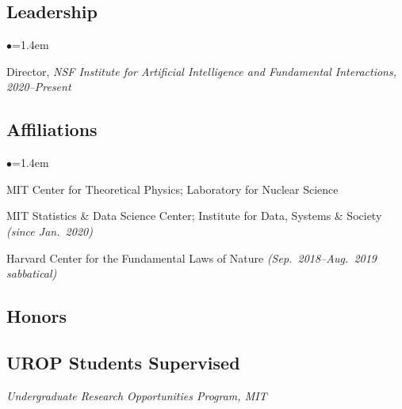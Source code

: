 \documentclass[11pt]{article}
\newcommand{\heading}[1]{\vspace{0in}\subsection*{#1} \vspace{.02in}}
\newcommand{\bbl}{\begin{list}{$\bullet$}{\leftmargin=1.4em \itemsep=-1pt}}
\newcommand{\el}{\end{list}}
\begin{document}

\newpage

\heading{Leadership}

\bbl
\item Director, \textit{NSF Institute for Artificial Intelligence and Fundamental Interactions, 2020--Present}
\el


\heading{Affiliations}

\bbl
\item MIT Center for Theoretical Physics; Laboratory for Nuclear Science
\item MIT Statistics \& Data Science Center; Institute for Data, Systems \& Society \textit{(since Jan.~2020)}
\item Harvard Center for the Fundamental Laws of Nature \textit{(Sep.~2018--Aug.~2019 sabbatical)}
\el



\heading{Honors}



\newpage




\heading{UROP Students Supervised}
\vspace{-.1in}
\textit{Undergraduate Research Opportunities Program, MIT}
\end{document}
